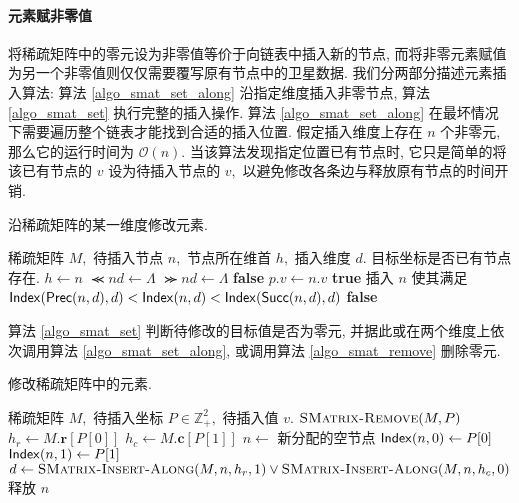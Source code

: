 \paragraph{元素赋非零值} 将稀疏矩阵中的零元设为非零值等价于向链表中插入新的节点, 而将非零元素赋值为另一个非零值则仅仅需要覆写原有节点中的卫星数据. 我们分两部分描述元素插入算法: 算法 \ref{algo_smat_set_along} 沿指定维度插入非零节点, 算法 \ref{algo_smat_set} 执行完整的插入操作. 算法 \ref{algo_smat_set_along} 在最坏情况下需要遍历整个链表才能找到合适的插入位置. 假定插入维度上存在 $n$ 个非零元, 那么它的运行时间为 $\mathcal{O}(n).$ 当该算法发现指定位置已有节点时, 它只是简单的将该已有节点的 $v$ 设为待插入节点的 $v,$ 以避免修改各条边与释放原有节点的时间开销.
\begin{breakablealgorithm}
\caption{沿稀疏矩阵的某一维度修改元素.}
\label{algo_smat_set_along}
\begin{algorithmic}[1]
\Require 稀疏矩阵 $M,$ 待插入节点 $n,$ 节点所在维首 $h,$ 插入维度 $d.$
\Ensure 目标坐标是否已有节点存在.
        \State $h \gets n$
        \State $\Prec{n}{d} \gets \Lambda$
        \State $\Succ{n}{d} \gets \Lambda$
        \State \Return \textbf{false}
    \EndIf
        \State $p.v \gets n.v$
        \State \Return \textbf{true}
    \EndIf
    \State 插入 $n$ 使其满足 $\mathsf{Index}(\mathsf{Prec}(n, d), d) < \mathsf{Index}(n, d) < \mathsf{Index}(\mathsf{Succ}(n, d), d)$
    \State \Return \textbf{false}
\EndFunction
\end{algorithmic}
\end{breakablealgorithm}

算法 \ref{algo_smat_set} 判断待修改的目标值是否为零元, 并据此或在两个维度上依次调用算法 \ref{algo_smat_set_along}, 或调用算法 \ref{algo_smat_remove} 删除零元.
\begin{breakablealgorithm}
\caption{修改稀疏矩阵中的元素.}
\label{algo_smat_set}
\begin{algorithmic}[1]
\Require 稀疏矩阵 $M,$ 待插入坐标 $P \in \mathbb{Z}_{+}^{2},$ 待插入值 $v.$
        \State $\textsc{SMatrix-Remove}(M, P)$
        \State \Return
    \EndIf
    \State $h_r \gets M.\bm{r}[P[0]]$
    \State $h_c \gets M.\bm{c}[P[1]]$
    \State $n \gets$ 新分配的空节点
    \State $\mathsf{Index}(n, 0) \gets P[0]$
    \State $\mathsf{Index}(n, 1) \gets P[1]$
    \State $d \gets \textsc{SMatrix-Insert-Along}(M, n, h_r, 1) \lor \textsc{SMatrix-Insert-Along}(M, n, h_c, 0)$
        \State 释放 $n$
    \EndIf
\EndProcedure
\end{algorithmic}
\end{breakablealgorithm}

